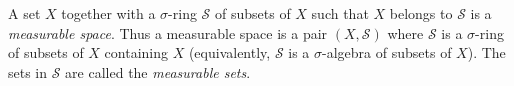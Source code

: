 A set $X$ together with a $\sigma$-ring $\mathcal{S}$ of subsets of $X$ such that $X$ belongs to $\mathcal{S}$ is a \textit{measurable space}. Thus a measurable space is a pair $(X, \mathcal{S})$ where $\mathcal{S}$ is a $\sigma$-ring of subsets of $X$ containing $X$ (equivalently, $\mathcal{S}$ is a $\sigma$-algebra of subsets of $X$). The sets in $\mathcal{S}$ are called the \textit{measurable sets}.
